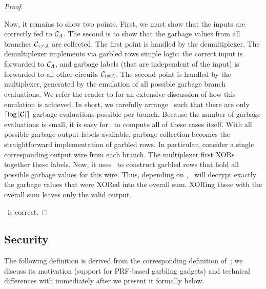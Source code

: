 \begin{proof}
\begin{itemize}
      Now, it remains to show two points.
      First, we must show that the inputs are correctly fed to
      $\mathcal C_A$. The second is to show that the garbage values from all
      branches $\mathcal C_{i \neq A}$ are collected.
      The first point is handled by the demultiplexer.
      The demultiplexer implements via garbled rows simple logic: the
      correct input is forwarded to $\mathcal C_A$, and garbage labels (that
      are independent of the input) is forwarded to all other circuits
      $\mathcal C_{i \neq A}$.
      The second point is handled by the multiplexer, generated by the
      emulation of all possible garbage branch evaluations.
      We refer the reader to  for an extensive
      discussion of how this emulation is achieved.
      In short, we carefully arrange \gadget\ such that there are
      only $\lceil \log |\vec \cir| \rceil$ garbage evaluations
      possible per branch.
      Because the number of garbage evaluations is small, it is easy
      for \gGb\ to compute all of these cases itself.
      With all possible garbage output labels available, garbage
      collection becomes the straightforward implementation of garbled
      rows. In particular, consider a single corresponding output wire
      from each branch.
      The multiplexer first XORs together these labels.
      Now, it uses \act\ to construct garbled rows that hold all
      possible garbage values for this wire.
      Thus, depending on \act, \gEv\ will decrypt exactly the garbage
      values that were XORed into the overall sum.
      XORing these with the overall sum leaves only the valid output.
  \end{itemize}
  \ourscheme\ is correct.
\end{proof}

\subsection{Security}

The following definition is derived from the corresponding definition
of~\HK; we discuss its motivation (support for PRF-based garbling
gadgets) and technical differences with \HK immediately after we
present it formally below.


